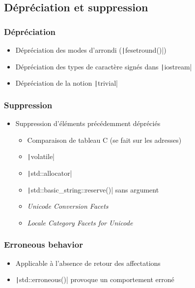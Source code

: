 \documentclass[C++.tex]{subfiles}
\begin{document}
\subsection*{Dépréciation et suppression}
\begin{frame}[fragile]
	\frametitle{Dépréciation}
	\begin{itemize}
		\item Dépréciation des modes d'arrondi (\texttt|fesetround()|)
		\item Dépréciation des types de caractère signés dans \texttt|iostream|
		\item Dépréciation de la notion \texttt|trivial|
	\end{itemize}
\end{frame}

\begin{frame}[fragile]
	\frametitle{Suppression}
	\begin{itemize}
		\item Suppression d'éléments précédemment dépréciés
		\begin{itemize}
			\item Comparaison de tableau C (se fait sur les adresses)
			\item \texttt|volatile|
			\item \texttt|std::allocator|
			\item \texttt|std::basic_string::reserve()| sans argument
			\item \textit{Unicode Conversion Facets}
			\item \textit{Locale Category Facets for Unicode}
		\end{itemize}
	\end{itemize}
\end{frame}

\begin{frame}[fragile]
	\frametitle{Erroneous behavior}
	\begin{itemize}
		\item Applicable à l'absence de retour des affectations
		\item \texttt|std::erroneous()| provoque un comportement erroné
	\end{itemize}

\end{frame}
\end{document}
